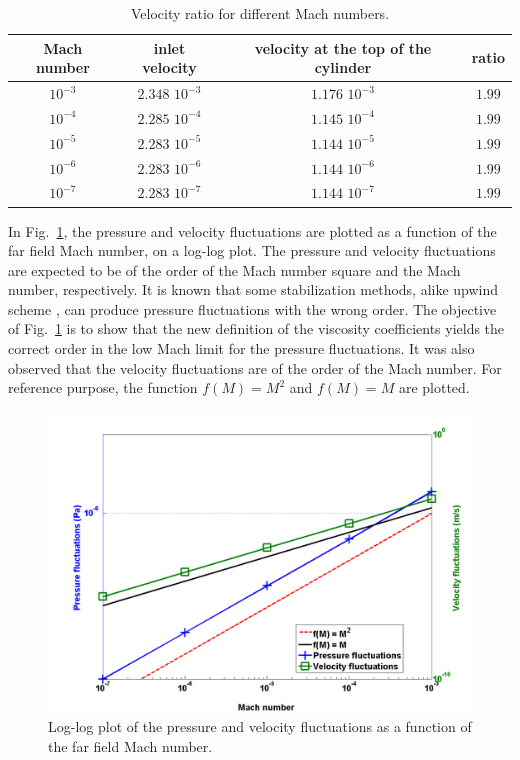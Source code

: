 \documentclass[preprint,10pt]{elsarticle}
\newcommand{\fig}[1]{Fig.~\ref{#1}}                      %
\begin{document}
\begin{table}[H]
\begin{center}
 \caption{\label{tbl:velocity_ratio}Velocity ratio for different Mach numbers.}
\begin{tabular}{|c|c|c|c|}
\hline
Mach number & inlet velocity & velocity at the top of the cylinder & ratio \\ \hline
$10^{-3}$ & $2.348$ $10^{-3}$ & $1.176$ $10^{-3}$& $1.99$ \\ \hline
$10^{-4}$ & $2.285$ $10^{-4}$ & $1.145$ $10^{-4}$& $1.99$ \\ \hline
$10^{-5}$ & $2.283$ $10^{-5}$ & $1.144$ $10^{-5}$ & $1.99$ \\ \hline
$10^{-6}$ & $2.283$ $10^{-6}$ & $1.144$ $10^{-6}$ & $1.99$ \\ \hline
$10^{-7}$ & $2.283$ $10^{-7}$ & $1.144$ $10^{-7}$ & $1.99$ \\ \hline
\end{tabular}
\end{center}
\nonumber
\end{table}
In \fig{fig:pressure_vel_fluc}, the pressure and velocity fluctuations are plotted as a function of the far field Mach number, on a log-log plot. The pressure and velocity fluctuations are expected to be of the order of the Mach number square and the Mach number, respectively. It is known that some stabilization methods, alike upwind scheme \cite{guillard}, can produce pressure fluctuations with the wrong order. The objective of \fig{fig:pressure_vel_fluc} is to show that the new definition of the viscosity coefficients yields the correct order in the low Mach limit for the pressure fluctuations. It was also observed that the velocity fluctuations are of the order of the Mach number. For reference purpose, the function $f(M) = M^2$ and $f(M)=M$ are plotted.  
\begin{figure}[H]
\centering
\includegraphics[width=\textwidth]{pressure_fluctuation.png}
\caption{Log-log plot of the pressure and velocity fluctuations as a function of the far field Mach number.}
\label{fig:pressure_vel_fluc}
\end{figure}
\end{document}

